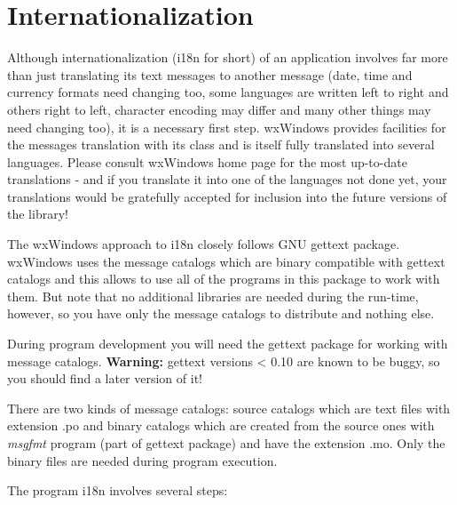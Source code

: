 \section{Internationalization}\label{internationalization}

Although internationalization (i18n for short) of an application involves far
more than just translating its text messages to another message (date, time and
currency formats need changing too, some languages are written left to right
and others right to left, character encoding may differ and many other things
may need changing too), it is a necessary first step. wxWindows provides
facilities for the messages translation with its 
 class and is itself fully translated into several
languages. Please consult wxWindows home page for the most up-to-date
translations - and if you translate it into one of the languages not done
yet, your translations would be gratefully accepted for inclusion into the
future versions of the library!

The wxWindows approach to i18n closely follows GNU gettext package. wxWindows uses the
message catalogs which are binary compatible with gettext catalogs and this
allows to use all of the programs in this package to work with them. But note
that no additional libraries are needed during the run-time, however, so you
have only the message catalogs to distribute and nothing else.

During program development you will need the gettext package for
working with message catalogs. {\bf Warning:} gettext versions < 0.10 are known
to be buggy, so you should find a later version of it!

There are two kinds of message catalogs: source catalogs which are text files
with extension .po and binary catalogs which are created from the source ones
with {\it msgfmt} program (part of gettext package) and have the extension .mo.
Only the binary files are needed during program execution.

The program i18n involves several steps:

